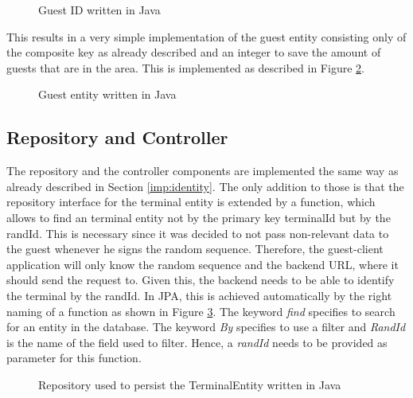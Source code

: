 \begin{figure}[H]
    
    \caption{Guest ID written in Java}
    \label{code:GuestID}
\end{figure}


This results in a very simple implementation of the guest entity consisting only of the composite key as already described and an integer to save the amount of guests that are in the area. This is implemented as described in Figure \ref{code:GuestEntity}.

\begin{figure}[H]
    
    \caption{Guest entity written in Java}
    \label{code:GuestEntity}
\end{figure}

\subsection{Repository and Controller}

The repository and the controller components are implemented the same way as already described in Section \ref{imp:identity}. The only addition to those is that the repository interface for the terminal entity is extended by a function, which allows to find an terminal entity not by the primary key terminalId but by the randId. This is necessary since it was decided to not pass non-relevant data to the guest whenever he signs the random sequence. Therefore, the guest-client application will only know the random sequence and the backend URL, where it should send the request to. Given this, the backend needs to be able to identify the terminal by the randId. In JPA, this is achieved automatically by the right naming of a function as shown in Figure \ref{code:repo:terminal}. The keyword \textit{find} specifies to search for an entity in the database. The keyword \textit{By} specifies to use a filter and \textit{RandId} is the name of the field used to filter. Hence, a \textit{ randId} needs to be provided as parameter for this function.

\begin{figure}[H]
    
    \caption{Repository used to persist the TerminalEntity written in Java}
    \label{code:repo:terminal}
\end{figure}

